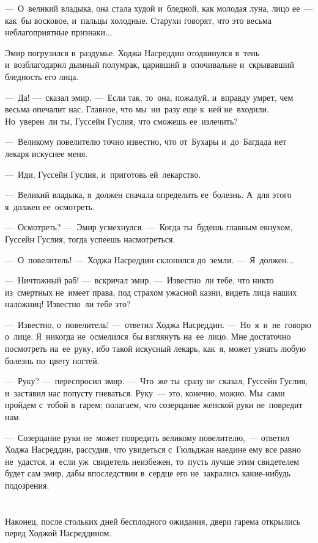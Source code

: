 \documentclass[12pt,a4paper]{book}
\begin{document}
—~О~великий владыка, она стала худой и~бледной, как молодая луна, лицо ее~— как~бы восковое, и~пальцы холодные. Старухи говорят, что это весьма неблагоприятные признаки...

Эмир погрузился в~раздумье. Ходжа Насреддин отодвинулся в~тень и~возблагодарил дымный полумрак, царивший в~опочивальне и~скрывавший бледность его лица.

—~Да! —~сказал эмир. —~Если так, то~она, пожалуй, и~вправду умрет, чем весьма опечалит нас. Главное, что мы~ни~разу еще к~ней не~входили. Но~уверен~ли ты, Гуссейн Гуслия, что сможешь ее~излечить?

—~Великому повелителю точно известно, что от~Бухары и~до~Багдада нет лекаря искуснее меня.

—~Иди, Гуссейн Гуслия, и~приготовь ей~лекарство.

—~Великий владыка, я~должен сначала определить ее~болезнь. А~для этого я~должен ее~осмотреть.

—~Осмотреть? —~Эмир усмехнулся. —~Когда ты~будешь главным евнухом, Гуссейн Гуслия, тогда успеешь насмотреться.

—~О~повелитель! —~Ходжа Насреддин склонился до~земли. —~Я~должен...

—~Ничтожный раб! —~вскричал эмир. —~Известно~ли тебе, что никто из~смертных не~имеет права, под страхом ужасной казни, видеть лица наших наложниц! Известно~ли тебе это?

—~Известно, о~повелитель! —~ответил Ходжа Насреддин. —~Но~я~и~не~говорю о~лице. Я~никогда не~осмелился~бы взглянуть на~ее~лицо. Мне достаточно посмотреть на~ее~руку, ибо такой искусный лекарь, как~я, может узнать любую болезнь по~цвету ногтей.

—~Руку? —~переспросил эмир. —~Что~же ты~сразу не~сказал, Гуссейн Гуслия, и~заставил нас попусту гневаться. Руку~— это, конечно, можно. Мы~сами пройдем с~тобой в~гарем; полагаем, что созерцание женской руки не~повредит нам.

—~Созерцание руки не~может повредить великому повелителю,~— ответил Ходжа Насреддин, рассудив, что увидеться с~Гюльджан наедине ему все равно не~удастся, и~если уж~свидетель неизбежен, то~пусть лучше этим свидетелем будет сам эмир, дабы впоследствии в~сердце его не~закрались какие-нибудь подозрения.


\chapter{}

Наконец, после стольких дней бесплодного ожидания, двери гарема открылись перед Ходжой Насреддином.
\end{document}

